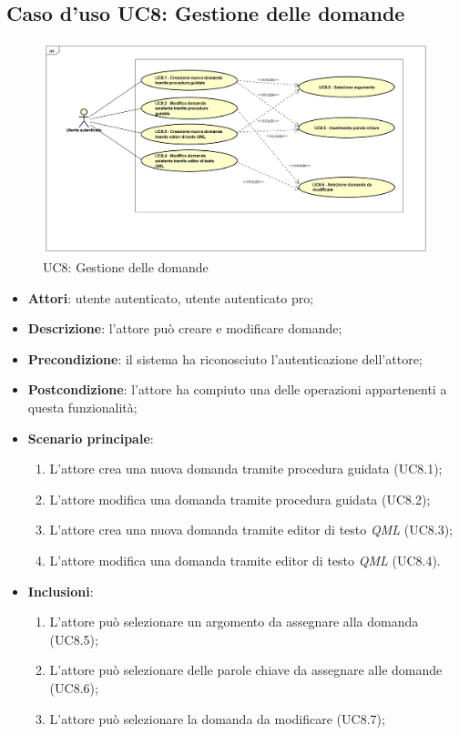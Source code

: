\newpage
\subsection{Caso d'uso UC8: Gestione delle domande}
	\label{UC8}
	\begin{figure}[h]
		\centering
			\includegraphics[scale=0.45,keepaspectratio]{UML/UC8.png}
		\caption{UC8: Gestione delle domande}
	\end{figure}
	\FloatBarrier
	\begin{itemize}
		\item
			\textbf{Attori}: utente autenticato, utente autenticato pro;
		\item		
			\textbf{Descrizione}: l'attore può creare e modificare domande;
		\item
			\textbf{Precondizione}: il sistema ha riconosciuto l'autenticazione dell'attore; 
		\item
			\textbf{Postcondizione}: l'attore ha compiuto una delle operazioni appartenenti a questa funzionalità;
		\item
			\textbf{Scenario principale}:
	       		\begin{enumerate}
					\item
					L'attore crea una nuova domanda tramite procedura guidata (UC8.1);
					\item
					L'attore modifica una domanda tramite procedura guidata (UC8.2);
					\item
					L'attore crea una nuova domanda tramite editor di testo \textit{QML} (UC8.3);
					\item
					L'attore modifica una domanda tramite editor di testo \textit{QML} (UC8.4).
	 			\end{enumerate}
		\item \textbf{Inclusioni}: 
			\begin{enumerate}
				\item L'attore può selezionare un argomento da assegnare alla domanda (UC8.5);
				\item L'attore può selezionare delle parole chiave da assegnare alle domande (UC8.6);								\item L'attore può selezionare la domanda da modificare (UC8.7);
			\end{enumerate}
	\end{itemize}
